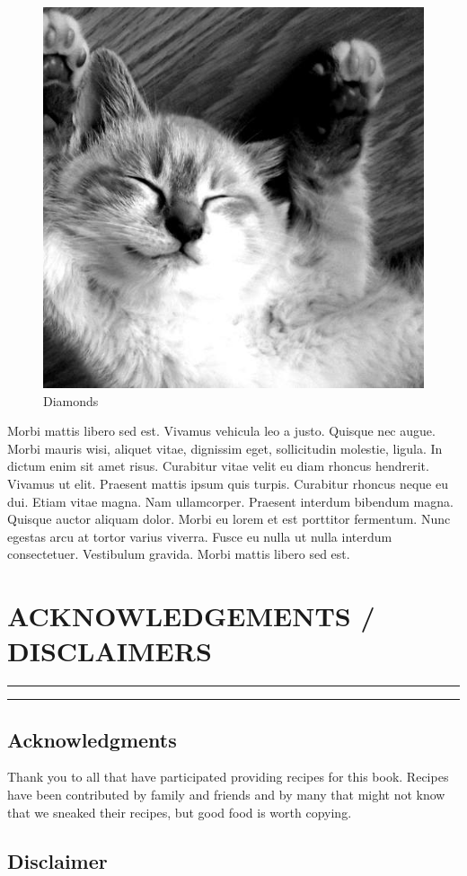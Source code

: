 \documentclass[
]{book}
\begin{document}
\begin{figure}  
 \begin{center}
    \includegraphics[width=.2\textwidth]{"images/500.jpg"}
  \caption{Diamonds} 
\end{center}
\end{figure}

Morbi mattis libero sed est. Vivamus vehicula leo a justo. Quisque nec augue. Morbi mauris wisi, aliquet vitae, dignissim eget, sollicitudin molestie, ligula. In dictum enim sit amet risus. Curabitur vitae velit eu diam rhoncus hendrerit. Vivamus ut elit. Praesent mattis ipsum quis turpis. Curabitur rhoncus neque eu dui. Etiam vitae magna. Nam ullamcorper. Praesent interdum bibendum magna. Quisque auctor aliquam dolor. Morbi eu lorem et est porttitor fermentum. Nunc egestas arcu at tortor varius viverra. Fusce eu nulla ut nulla interdum consectetuer. Vestibulum gravida. Morbi mattis libero sed est.

\hypertarget{acknowledgements-disclaimers}{%
\chapter*{ACKNOWLEDGEMENTS / DISCLAIMERS}\label{acknowledgements-disclaimers}}


\begin{center}\rule{0.5\linewidth}{0.5pt}\end{center}

\begin{center}\rule{0.5\linewidth}{0.5pt}\end{center}

\hypertarget{acknowledgments}{%
\section*{Acknowledgments}\label{acknowledgments}}


Thank you to all that have participated providing recipes for this book. Recipes have been contributed by family and friends and by many that might not know that we sneaked their recipes, but good food is worth copying.

\hypertarget{disclaimer}{%
\section*{Disclaimer}\label{disclaimer}}
\end{document}
